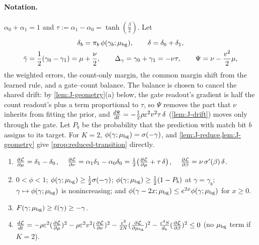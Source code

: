\paragraph{Notation.} $\alpha_0+\alpha_1=1$ and $\tau:=\alpha_1-\alpha_0=\tanh(\frac{\beta}{2})$. Let
\begin{gather*}
 \delta_b=\pi_b\,\phi(\gamma_b;\cbg),\qquad \delta=\delta_0+\delta_1,\\
 \bar\gamma=\tfrac{1}{2}(\gamma_0-\gamma_1)=\cnt+\tfrac{\nu}{2},\qquad \Delta_\gamma=\gamma_0+\gamma_1=-\nu\tau,\qquad \Psi=\nu-\tfrac{v^2}{2}\cnt,
\end{gather*}
the weighted errors, the count-only margin, the common margin shift from the learned rule, and a gate--count balance. The balance is
chosen to cancel the shared drift: by \cref{lem:J-geometry}(a) below, the gate readout's gradient is half the count readout's plus a
term proportional to $\tau$, so $\Psi$ removes the part that $\nu$ inherits from fitting the prior, and $\ddt{\Psi}=-\frac{1}{2}\rho\initscale^2v^2\tau\,\delta$
(\cref{lem:J-drift}) moves only through the gate. Let $P_b$ be the
probability that the prediction with match bit $b$ assigns to its target.
For $K=2$, $\phi(\gamma;\mu_{\mathrm{bg}})=\sigma(-\gamma)$, and \cref{lem:J-reduce,lem:J-geometry} give \cref{prop:reduced-transition} directly.

\begin{lemma}[Derivatives]
\label{lem:J-geometry}
\begin{enumerate}[label=(\alph*),leftmargin=*,itemsep=2pt,topsep=3pt]
\item $\pd{\mathcal L}{\cnt}=\delta_1-\delta_0$, $\quad\pd{\mathcal L}{\nu}=\alpha_1\delta_1-\alpha_0\delta_0=\tfrac{1}{2}\bigl(\pd{\mathcal L}{\cnt}+\tau\,\delta\bigr)$, $\quad\pd{\mathcal L}{\beta}=\nu\,\sigma'(\beta)\,\delta$.
\item $0<\phi<1$; $\phi(\gamma;\mu_{\mathrm{bg}})\ge\frac{1}{2}\sigma(-\gamma)$; $\phi(\gamma;\mu_{\mathrm{bg}})\ge\frac{1}{2}(1-P_b)$ at $\gamma=\gamma_b$; $\gamma\mapsto\phi(\gamma;\mu_{\mathrm{bg}})$ is nonincreasing; and
$\phi(\gamma-2x;\mu_{\mathrm{bg}})\le e^{2x}\phi(\gamma;\mu_{\mathrm{bg}})$ for $x\ge0$.
\item $F(\gamma;\mu_{\mathrm{bg}})\ge\ell(\gamma)\ge-\gamma$.
\item $\ddt{\mathcal L}=-\rho\initscale^2(\pd{\mathcal L}{\cnt})^2-\rho\initscale^2v^2(\pd{\mathcal L}{\nu})^2-\frac{\initscale^2}{2N}(\pd{\mathcal L}{\cbg})^2-\frac{\initscale^4S}{d_{\mathrm h}}(\pd{\mathcal L}{\beta})^2\le0$ (no $\mu_{\mathrm{bg}}$ term if $K=2$).
\end{enumerate}
\end{lemma}

